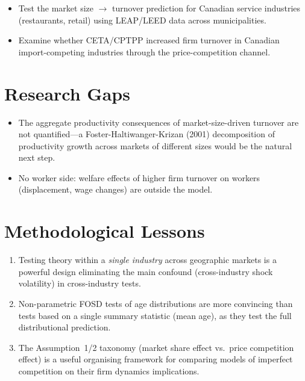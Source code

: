 \begin{itemize}
  \item Test the market size $\to$ turnover prediction for Canadian service
    industries (restaurants, retail) using LEAP/LEED data across municipalities.
  \item Examine whether CETA/CPTPP increased firm turnover in Canadian
    import-competing industries through the price-competition channel.
\end{itemize}

\section{Research Gaps}

\begin{itemize}
  \item The aggregate productivity consequences of market-size-driven turnover
    are not quantified---a Foster-Haltiwanger-Krizan (2001) decomposition
    of productivity growth across markets of different sizes would be the
    natural next step.
  \item No worker side: welfare effects of higher firm turnover on workers
    (displacement, wage changes) are outside the model.
\end{itemize}

\section{Methodological Lessons}

\begin{enumerate}
  \item Testing theory within a \emph{single industry} across geographic
    markets is a powerful design eliminating the main confound (cross-industry
    shock volatility) in cross-industry tests.
  \item Non-parametric FOSD tests of age distributions are more convincing
    than tests based on a single summary statistic (mean age), as they test
    the full distributional prediction.
  \item The Assumption~1/2 taxonomy (market share effect vs.\ price
    competition effect) is a useful organising framework for comparing models
    of imperfect competition on their firm dynamics implications.
\end{enumerate}

